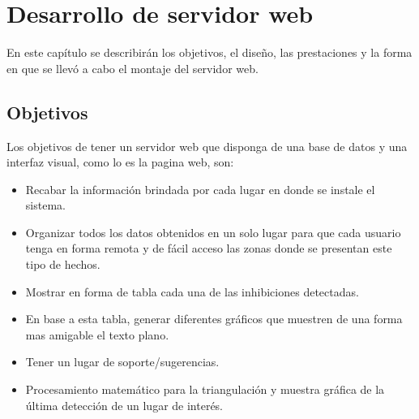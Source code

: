 \chapter{Desarrollo de servidor web}
\par En este capítulo se describirán los objetivos, el diseño, las prestaciones y la forma en que se llevó a cabo el montaje del servidor web.
\section{Objetivos}
\par Los objetivos de tener un servidor web que disponga de una base de datos y una interfaz visual, como lo es la pagina web, son:

    \begin{itemize}
        \item Recabar la información brindada por cada lugar en donde se instale el sistema.
        \item Organizar todos los datos obtenidos en un solo lugar para que cada usuario tenga en forma remota y de fácil acceso las zonas donde se presentan este tipo de hechos. 
        \item Mostrar en forma de tabla cada una de las inhibiciones detectadas.
        \item En base a esta tabla, generar diferentes gráficos que muestren de una forma mas amigable el texto plano.
        \item Tener un lugar de soporte/sugerencias.
        \item Procesamiento matemático para la triangulación y muestra gráfica de la última detección de un lugar de interés. 
    \end{itemize}

